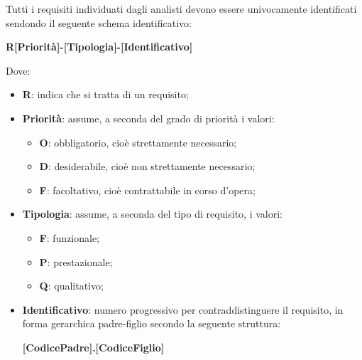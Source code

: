 Tutti i requisiti individuati dagli analisti devono essere univocamente identificati sendondo il seguente schema identificativo:

\begin{center}
    \textbf{R[Priorit\`{a}]-[Tipologia]-[Identificativo]}
\end{center}

Dove:

\begin{itemize}
    \item \textbf{R}: indica che si tratta di un requisito;
    \item \textbf{Priorit\`{a}}: assume, a seconda del grado di priorit\`{a} i valori:
    \begin{itemize}
        \item \textbf{O}: obbligatorio, cio\`{e} strettamente necessario;
        \item \textbf{D}: desiderabile, cio\`{e} non strettamente necessario;
        \item \textbf{F}: facoltativo, cio\`{e} contrattabile in corso d'opera;
    \end{itemize}
    \item \textbf{Tipologia}: assume, a seconda del tipo di requisito, i valori:
    \begin{itemize}
        \item \textbf{F}: funzionale;
        \item \textbf{P}: prestazionale;
        \item \textbf{Q}: qualitativo;
    \end{itemize}
    \item \textbf{Identificativo}: numero progressivo per contraddistinguere il requisito, in forma gerarchica padre-figlio secondo la seguente struttura:
    \begin{center}
        \textbf{[CodicePadre].[CodiceFiglio]}
    \end{center}
\end{itemize}